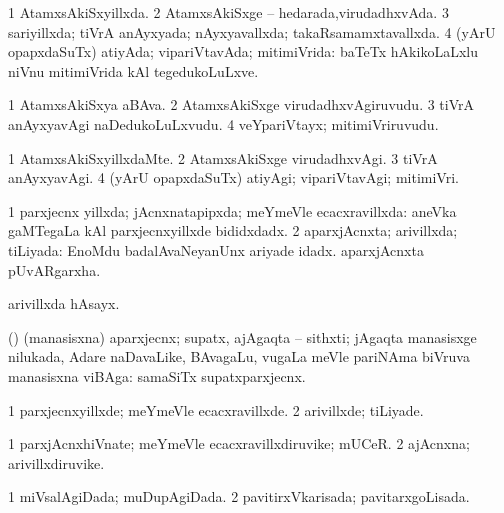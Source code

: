 {\bentry
{} 
\gl{\gu}
\expl{}
\bmng
\bnum
\num{1} AtamxsAkiSxyillxda. 
\num{2} AtamxsAkiSxge -- hedarada,virudadhxvAda. 
\num{3} sariyillxda; tiVrA anAyxyada; nAyxyavallxda; takaRsamamxtavallxda. 
\num{4} (yArU opapxdaSuTx) atiyAda; vipariVtavAda; mitimiVrida:  baTeTx hAkikoLaLxlu niVnu mitimiVrida kAl tegedukoLuLxve. 
\enum
\emng
\eentry

\bentry
{}
\gl{\nA}
\expl{}
\bmng
\bnum
\num{1} AtamxsAkiSxya aBAva. 
\num{2} AtamxsAkiSxge virudadhxvAgiruvudu. 
\num{3} tiVrA anAyxyavAgi naDedukoLuLxvudu. 
\num{4} veYpariVtayx; mitimiVriruvudu. 
\enum
\emng
\eentry

\bentry
{} 
\gl{\kirxvi}
\expl{}
\bmng
\bnum
\num{1} AtamxsAkiSxyillxdaMte. 
\num{2} AtamxsAkiSxge virudadhxvAgi. 
\num{3} tiVrA anAyxyavAgi. 
\num{4} (yArU opapxdaSuTx) atiyAgi; vipariVtavAgi; mitimiVri. 
\enum
\emng
\eentry

\bentry
{} 
\gl{\gu}
\expl{}
\bmng
\bnum
\num{1} parxjecnx yillxda; jAcnxnatapipxda; meYmeVle ecacxravillxda:  aneVka gaMTegaLa kAl parxjecnxyillxde bididxdadx. 
\num{2} aparxjAcnxta; arivillxda; tiLiyada:  EnoMdu badalAvaNeyanUnx ariyade idadx.  aparxjAcnxta pUvARgarxha. 
\enum
\emng

\noindent
\gl{\pagu}
\expl{}
\bmng
{} arivillxda hAsayx. 
\emng
\eentry

\bentry
{} 
\gl{\nA}
\expl{}
\bmng
 (\mavi) (manasisxna) aparxjecnx; supatx, ajAgaqta -- sithxti; jAgaqta manasisxge nilukada, Adare naDavaLike, BAvagaLu, \mo vugaLa meVle pariNAma biVruva manasisxna viBAga:  samaSiTx supatxparxjecnx. 
\emng
\eentry

\bentry
{} 
\gl{\kirxvi}
\expl{}
\bmng
\bnum
\num{1} parxjecnxyillxde; meYmeVle ecacxravillxde. 
\num{2} arivillxde; tiLiyade. 
\enum
\emng
\eentry

\bentry
{} 
\gl{\nA}
\expl{}
\bmng
\bnum
\num{1} parxjAcnxhiVnate; meYmeVle ecacxravillxdiruvike; mUCeR. 
\num{2} ajAcnxna; arivillxdiruvike. 
\enum
\emng
\eentry

\bentry
{} 
\gl{\gu}
\expl{}
\bmng
\bnum
\num{1} miVsalAgiDada; muDupAgiDada. 
\num{2} pavitirxVkarisada; pavitarxgoLisada. 
\enum
\emng
\eentry

}
